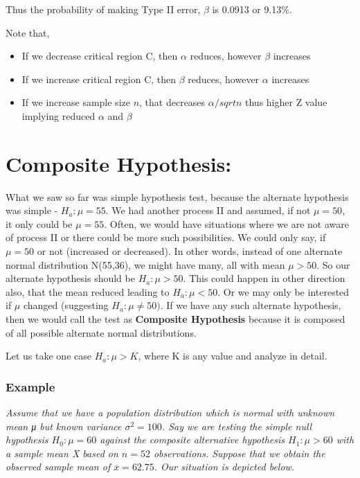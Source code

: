 \documentclass[float=false,crop=false]{standalone}
\begin{document}
    Thus the probability of making Type II error, \(\beta\) is 0.0913 or
9.13\%.
\begin{tcolorbox}[colback=green!5,colframe=green!40!black,title={Adjusting $\alpha$ and $\beta$}]
Note that, 
\begin{itemize}
\item If we decrease critical region C, then $\alpha$ reduces, however $\beta$ increases
\item If we increase critical region C, then $\beta$ reduces, however $\alpha$ increases
\item If we increase sample size $n$, that decreases $\alpha/sqrt{n}$ thus higher Z value implying reduced $\alpha$ and $\beta$
\end{itemize}
\end{tcolorbox}
    \section{Composite Hypothesis:}\label{composite-hypothesis}

What we saw so far was simple hypothesis test, because the alternate
hypothesis was simple - \(H_a: \mu = 55\). We had another process II and
assumed, if not \(\mu = 50\), it only could be \(\mu = 55\). Often, we
would have situations where we are not aware of process II or there
could be more such possibilities. We could only say, if \(\mu = 50\) or
not (increased or decreased). In other words, instead of one alternate
normal distribution N(55,36), we might have many, all with mean
\(\mu > 50\). So our alternate hypothesis should be \(H_a: \mu > 50\).
This could happen in other direction also, that the mean reduced leading
to \(H_a: \mu < 50\). Or we may only be interested if \(\mu\) changed
(suggesting \(H_a:\mu \neq 50)\). If we have any such alternate
hypothesis, then we would call the test as \textbf{Composite Hypothesis}
because it is composed of all possible alternate normal distributions.

Let us take one case \(H_a:\mu > K\), where K is any value and analyze
in detail.

\subsubsection{Example}\label{example}

\emph{Assume that we have a population distribution which is normal with
unknown mean μ but known variance \(σ^2 = 100\). Say we are testing the
simple null hypothesis \(H_0: \mu = 60\) against the composite
alternative hypothesis \(H_1: \mu > 60\) with a sample mean X based on
\(n = 52\) observations. Suppose that we obtain the observed sample mean
of \(\overline{x} = 62.75\). Our situation is depicted below.}
    \begin{center}
    \end{center}
    { \hspace*{\fill} \\}
    
\end{document}
